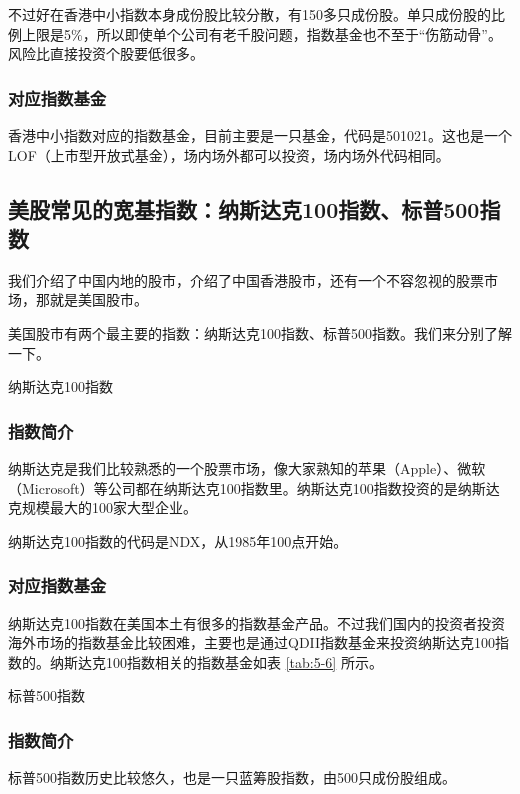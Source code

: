 不过好在香港中小指数本身成份股比较分散，有150多只成份股。单只成份股的比例上限是5\%，所以即使单个公司有老千股问题，指数基金也不至于“伤筋动骨”。风险比直接投资个股要低很多。

\subsubsection{对应指数基金}

香港中小指数对应的指数基金，目前主要是一只基金，代码是501021。这也是一个LOF（上市型开放式基金），场内场外都可以投资，场内场外代码相同。

\subsection{美股常见的宽基指数：纳斯达克100指数、标普500指数}
我们介绍了中国内地的股市，介绍了中国香港股市，还有一个不容忽视的股票市场，那就是美国股市。

美国股市有两个最主要的指数：纳斯达克100指数、标普500指数。我们来分别了解一下。

{\fangsong 纳斯达克100指数}

\subsubsection{指数简介}

纳斯达克是我们比较熟悉的一个股票市场，像大家熟知的苹果（Apple）、微软（Microsoft）等公司都在纳斯达克100指数里。纳斯达克100指数投资的是纳斯达克规模最大的100家大型企业。

纳斯达克100指数的代码是NDX，从1985年100点开始。

\subsubsection{对应指数基金}

纳斯达克100指数在美国本土有很多的指数基金产品。不过我们国内的投资者投资海外市场的指数基金比较困难，主要也是通过QDII指数基金来投资纳斯达克100指数的。纳斯达克100指数相关的指数基金如表 \ref{tab:5-6} 所示。






{\fangsong 标普500指数}

\subsubsection{指数简介}

标普500指数历史比较悠久，也是一只蓝筹股指数，由500只成份股组成。

